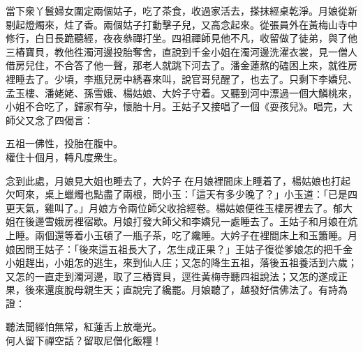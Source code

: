 當下衆丫鬟婦女圍定兩個姑子，吃了茶食，收過家活去，搽抹經桌乾淨。月娘從新剔起燈燭來，炷了香。兩個姑子打動擊子兒，又高念起來。從張員外在黃梅山寺中修行，白日長跪聽經，夜夜叅禪打坐。四祖禪師見他不凡，收留做了徒弟，與了他三樁寶貝，教他徃濁河邊投胎奪舍，直說到千金小姐在濁河邊洗濯衣裳，見一僧人借房兒住，不合答了他一聲，那老人就跳下河去了。潘金蓮熬的磕困上來，就徃房裡睡去了。{}少頃，李瓶兒房中綉春來叫，說官哥兒醒了，也去了。只剩下李嬌兒、孟玉樓、潘姥姥、孫雪娥、楊姑娘、大妗子守着。又聽到河中漂過一個大鱗桃來，小姐不合吃了，歸家有孕，懷胎十月。王姑子又接唱了一個《耍孩兒》。唱完，大師父又念了四偈言：

\begin{myquote}
五祖一佛性，投胎在腹中。\\權住十個月，轉凡度衆生。
\end{myquote}

念到此處，月娘見大姐也睡去了，大妗子𢱉在月娘裡間床上睡着了，楊姑娘也打起欠呵來，{}桌上蠟燭也點盡了兩根，問小玉：「這天有多少晚了？」小玉道：「已是四更天氣，雞叫了。」月娘方令兩位師父收拾經卷。楊姑娘便徃玉樓房裡去了。郁大姐在後邊雪娥房裡宿歇。月娘打發大師父和李嬌兒一處睡去了。王姑子和月娘在炕上睡。兩個還等着小玉頓了一瓶子茶，吃了纔睡。大妗子在裡間床上和玉簫睡。月娘因問王姑子：「後來這五祖長大了，怎生成正果？」{}王姑子復從爹娘怎的把千金小姐趕出，小姐怎的逃生，來到仙人庄；又怎的降生五祖，落後五祖養活到六歲；又怎的一直走到濁河邊，取了三樁寶貝，逕徃黃梅寺聽四祖說法；又怎的遂成正果，後來還度脫母親生天；直說完了纔罷。月娘聽了，越發好信佛法了。有詩為證：

\begin{myquote}
聽法聞經怕無常，紅蓮舌上放毫光。\\何人留下禪空話？留取尼僧化飯糧！
\end{myquote}

 

